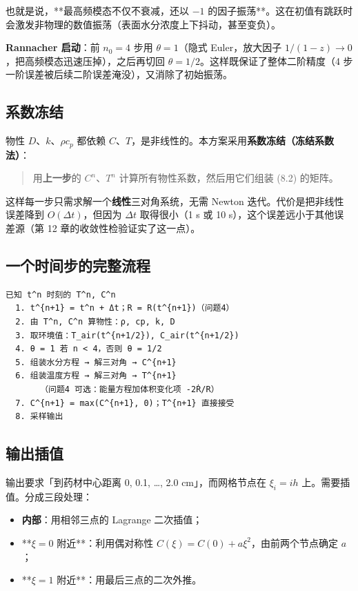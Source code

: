 也就是说，**最高频模态不仅不衰减，还以 $-1$ 的因子振荡**。这在初值有跳跃时会激发非物理的数值振荡（表面水分浓度上下抖动，甚至变负）。


\textbf{Rannacher 启动}：前 $n_0=4$ 步用 $\theta=1$（隐式 Euler，放大因子 $1/(1-z)\to0$，把高频模态迅速压掉），之后再切回 $\theta=1/2$。这样既保证了整体二阶精度（4 步一阶误差被后续二阶误差淹没），又消除了初始振荡。


\subsection{系数冻结}


物性 $D$、$k$、$\rho c_p$ 都依赖 $C$、$T$，是非线性的。本方案采用\textbf{系数冻结（冻结系数法）}：


\begin{quote}
用\textbf{上一步}的 $C^n$、$T^n$ 计算所有物性系数，然后用它们组装 (8.2) 的矩阵。
\end{quote}


这样每一步只需求解一个\textbf{线性}三对角系统，无需 Newton 迭代。代价是把非线性误差降到 $O(\Delta t)$，但因为 $\Delta t$ 取得很小（1 s 或 10 s），这个误差远小于其他误差源（第 12 章的收敛性检验证实了这一点）。


\subsection{一个时间步的完整流程}


\begin{lstlisting}
已知 t^n 时刻的 T^n, C^n
  1. t^{n+1} = t^n + Δt；R = R(t^{n+1})（问题4）
  2. 由 T^n, C^n 算物性：ρ, cp, k, D
  3. 取环境值：T_air(t^{n+1/2}), C_air(t^{n+1/2})
  4. θ = 1 若 n < 4，否则 θ = 1/2
  5. 组装水分方程 → 解三对角 → C^{n+1}
  6. 组装温度方程 → 解三对角 → T^{n+1}
       （问题4 可选：能量方程加体积变化项 -2Ṙ/R）
  7. C^{n+1} = max(C^{n+1}, 0)；T^{n+1} 直接接受
  8. 采样输出
\end{lstlisting}


\subsection{输出插值}


输出要求「到药材中心距离 0, 0.1, …, 2.0 cm」，而网格节点在 $\xi_i=ih$ 上。需要插值。分成三段处理：


\begin{itemize}
\item \textbf{内部}：用相邻三点的 Lagrange 二次插值；
\item **$\xi=0$ 附近**：利用偶对称性 $C(\xi)=C(0)+a\xi^2$，由前两个节点确定 $a$；
\item **$\xi=1$ 附近**：用最后三点的二次外推。
\end{itemize}


